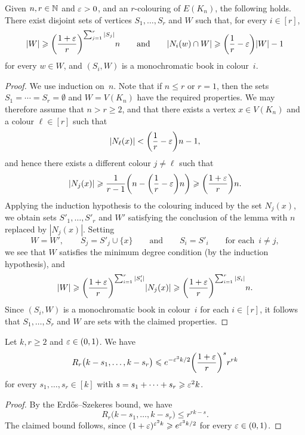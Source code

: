 \begin{lemma}\label{lem:ESz:steps}
  Given\/ $n,r \in \mathbb{N}$ and\/ $\varepsilon > 0$, and an $r$-colouring of $E(K_n)$, the following holds. There exist disjoint sets of vertices\/ $S_1,\dots,S_r$ and\/ $W$ such that, for every $i \in [r]$, 
  $$|W| \geqslant \bigg( \frac{1+\varepsilon}{r} \bigg)^{\sum_{j = 1}^r |S_j|} n \qquad \text{and} \qquad |N_i(w) \cap W| \geqslant \bigg( \frac{1}{r} - \varepsilon \bigg) |W| - 1$$ 
  for every $w \in W$, and $(S_i,W)$ is a monochromatic book in colour~$i$.
\end{lemma}

\begin{proof}
  We use induction on~$n$. Note that if $n \le r$ or $r = 1$, then the sets $S_1 = \cdots = S_r = \emptyset$ and $W = V(K_n)$ have the required properties. We may therefore assume that $n > r \ge 2$, and that there exists a vertex $x \in V(K_n)$ and a colour $\ell \in [r]$ such that
  $$|N_\ell(x)| < \bigg( \frac{1}{r} - \varepsilon \bigg) n - 1,$$
  and hence there exists a different colour $j \ne \ell$ such that 
  $$|N_j(x)| \geqslant \frac{1}{r-1} \bigg( n - \bigg( \frac{1}{r} - \varepsilon \bigg) n \bigg) \geqslant \bigg( \frac{1 + \varepsilon}{r} \bigg) n.$$
  Applying the induction hypothesis to the colouring induced by the set $N_j(x)$, we obtain sets $S'_1,\ldots,S'_r$ and $W'$ satisfying the conclusion of the lemma with $n$ replaced by $|N_j(x)|$. Setting 
  $$W = W', \qquad S_j = S'_j \cup \{x\} \qquad \text{and} \qquad S_i = S'_i \qquad \text{for each } \, i \ne j,$$ 
  we see that $W$ satisfies the minimum degree condition (by the induction hypothesis), and
  $$|W| \geqslant \bigg( \frac{1+\varepsilon}{r} \bigg)^{\sum_{i = 1}^r |S'_i|}|N_j(x)| \geqslant \bigg( \frac{1+\varepsilon}{r} \bigg)^{\sum_{i=1}^r |S_i|}n.$$
  Since $(S_i,W)$ is a monochromatic book in colour~$i$ for each $i \in [r]$, it follows that $S_1,\dots,S_r$ and $W$ are sets with the claimed properties.
\end{proof}

\begin{lemma}\label{lem:many:ESz:steps}
  Let\/ $k,r \ge 2$ and\/ $\varepsilon \in (0,1)$. We have 
  $$R_r\big( k - s_1, \ldots, k - s_r \big) \leqslant e^{-\varepsilon^3 k / 2} \bigg( \frac{1+\varepsilon}{r} \bigg)^s r^{rk}$$
  for every $s_1,\ldots,s_r \in [k]$ with\/ $s = s_1 + \cdots + s_r \geqslant \varepsilon^2 k$.
\end{lemma}
  
\begin{proof}
  By the Erd\H{o}s--Szekeres bound, we have
  $$R_r\big( k - s_1, \ldots, k - s_r \big) \le r^{rk - s}.$$
  The claimed bound follows, since $( 1 + \varepsilon )^{\varepsilon^2 k} \geqslant e^{\varepsilon^3 k/2}$ for every $\varepsilon \in (0,1)$.
\end{proof}


